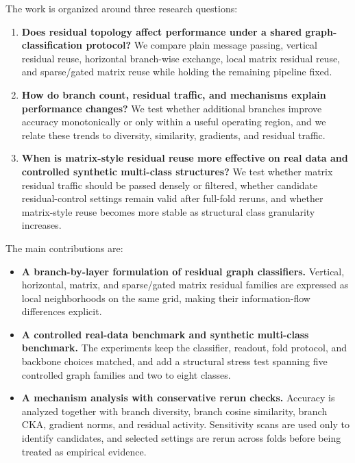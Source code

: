 The work is organized around three research questions:
\begin{enumerate}
    \item \textbf{Does residual topology affect performance under a shared graph-classification protocol?} We compare plain message passing, vertical residual reuse, horizontal branch-wise exchange, local matrix residual reuse, and sparse/gated matrix reuse while holding the remaining pipeline fixed.
    \item \textbf{How do branch count, residual traffic, and mechanisms explain performance changes?} We test whether additional branches improve accuracy monotonically or only within a useful operating region, and we relate these trends to diversity, similarity, gradients, and residual traffic.
    \item \textbf{When is matrix-style residual reuse more effective on real data and controlled synthetic multi-class structures?} We test whether matrix residual traffic should be passed densely or filtered, whether candidate residual-control settings remain valid after full-fold reruns, and whether matrix-style reuse becomes more stable as structural class granularity increases.
\end{enumerate}

The main contributions are:
\begin{itemize}
    \item \textbf{A branch-by-layer formulation of residual graph classifiers.} Vertical, horizontal, matrix, and sparse/gated matrix residual families are expressed as local neighborhoods on the same grid, making their information-flow differences explicit.
    \item \textbf{A controlled real-data benchmark and synthetic multi-class benchmark.} The experiments keep the classifier, readout, fold protocol, and backbone choices matched, and add a structural stress test spanning five controlled graph families and two to eight classes.
    \item \textbf{A mechanism analysis with conservative rerun checks.} Accuracy is analyzed together with branch diversity, branch cosine similarity, branch CKA, gradient norms, and residual activity. Sensitivity scans are used only to identify candidates, and selected settings are rerun across folds before being treated as empirical evidence.
\end{itemize}
 